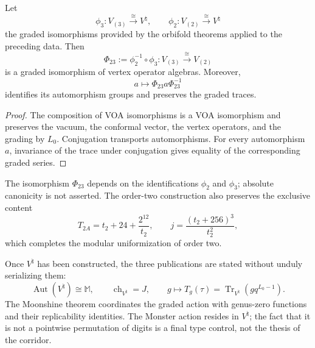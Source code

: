 \begin{theorem}
\label{thm:cierre-vtm-equivalencia-voa-23}
Let
\[
 \phi_3:V_{(3)}\xrightarrow{\ \cong\ }V^\natural,
 \qquad
 \phi_2:V_{(2)}\xrightarrow{\ \cong\ }V^\natural
\]
the graded isomorphisms provided by the orbifold theorems
applied to the preceding data. Then
\[
 \boxed{\Phi_{23}:=\phi_2^{-1}\circ\phi_3:
 V_{(3)}\xrightarrow{\ \cong\ }V_{(2)}}
\]
is a graded isomorphism of vertex operator algebras. Moreover,
\[
 a\longmapsto\Phi_{23}a\Phi_{23}^{-1}
\]
identifies its automorphism groups and preserves the graded traces.
\end{theorem}

\begin{proof}
The composition of VOA isomorphisms is a VOA isomorphism and preserves the
vacuum, the conformal vector, the vertex operators, and the grading by
\(L_0\). Conjugation transports automorphisms. For every automorphism
\(a\), invariance of the trace under conjugation gives equality of the
corresponding graded series.
\end{proof}

The isomorphism \(\Phi_{23}\) depends on the identifications \(\phi_2\) and
\(\phi_3\); absolute canonicity is not asserted. The order-two construction
also preserves the exclusive content
\[
 T_{2A}=t_2+24+\frac{2^{12}}{t_2},
 \qquad
 \boxed{j=\frac{(t_2+256)^3}{t_2^2}},
\]
which completes the modular uniformization of order two.

Once \(V^\natural\) has been constructed, the three publications are stated without
unduly serializing them:
\[
 \operatorname{Aut}(V^\natural)\cong\mathbb M,
 \qquad
 \operatorname{ch}_{V^\natural}=J,
 \qquad
 g\longmapsto T_g(\tau)
 =\operatorname{Tr}_{V^\natural}\!\left(gq^{L_0-1}\right).
\]
The Moonshine theorem coordinates the graded action with genus-zero functions
and their replicability identities. The Monster action resides
in \(V^\natural\); the fact that it is not a pointwise permutation of digits is a final type
control, not the thesis of the corridor.

